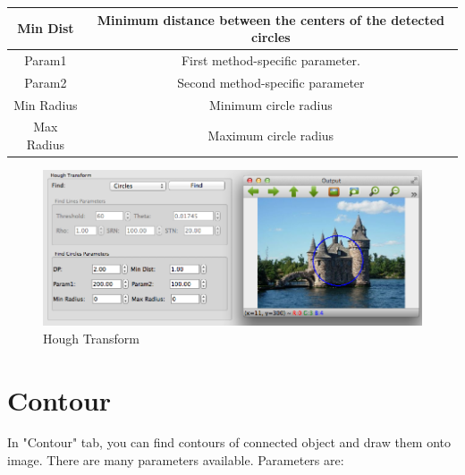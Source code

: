 \documentclass{article}
\begin{document}
\begin{table}[H]
\begin{center}
\begin{tabular}{|c|c|l|l|l|}
Min Dist               & \multicolumn{4}{|c|}{Minimum distance between the centers of the detected circles}                                                                                     \\ \hline
Param1                 & \multicolumn{4}{|c|}{First method-specific parameter.}      \\ \hline
Param2                 & \multicolumn{4}{|c|}{Second method-specific parameter} \\ \hline
Min Radius             & \multicolumn{4}{|c|}{Minimum circle radius}                                                                                                                            \\ \hline
Max Radius             & \multicolumn{4}{|c|}{Maximum circle radius}                                                                                                                            \\ \hline
\end{tabular}
\end{center}
\end{table}

\begin{figure}[H]
\begin{center}
\includegraphics[scale=0.5]{toolboxHough.png}
\caption{Hough Transform}
\end{center}
\end{figure}	

\section{Contour}
In "Contour" tab, you can find contours of connected object and draw them onto image. There are many parameters available. Parameters are:
\end{document}
